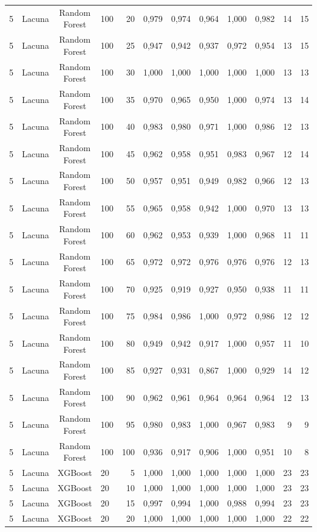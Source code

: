 \begin{longtable}{ccclrrrrrrrr}
5 & Lacuna & Random Forest & 100 & 20 & 0,979 & 0,974 & 0,964 & 1,000 & 0,982 & 14 & 15 \\
5 & Lacuna & Random Forest & 100 & 25 & 0,947 & 0,942 & 0,937 & 0,972 & 0,954 & 13 & 15 \\
5 & Lacuna & Random Forest & 100 & 30 & 1,000 & 1,000 & 1,000 & 1,000 & 1,000 & 13 & 13 \\
5 & Lacuna & Random Forest & 100 & 35 & 0,970 & 0,965 & 0,950 & 1,000 & 0,974 & 13 & 14 \\
5 & Lacuna & Random Forest & 100 & 40 & 0,983 & 0,980 & 0,971 & 1,000 & 0,986 & 12 & 13 \\
5 & Lacuna & Random Forest & 100 & 45 & 0,962 & 0,958 & 0,951 & 0,983 & 0,967 & 12 & 14 \\
5 & Lacuna & Random Forest & 100 & 50 & 0,957 & 0,951 & 0,949 & 0,982 & 0,966 & 12 & 13 \\
5 & Lacuna & Random Forest & 100 & 55 & 0,965 & 0,958 & 0,942 & 1,000 & 0,970 & 13 & 13 \\
5 & Lacuna & Random Forest & 100 & 60 & 0,962 & 0,953 & 0,939 & 1,000 & 0,968 & 11 & 11 \\
5 & Lacuna & Random Forest & 100 & 65 & 0,972 & 0,972 & 0,976 & 0,976 & 0,976 & 12 & 13 \\
5 & Lacuna & Random Forest & 100 & 70 & 0,925 & 0,919 & 0,927 & 0,950 & 0,938 & 11 & 11 \\
5 & Lacuna & Random Forest & 100 & 75 & 0,984 & 0,986 & 1,000 & 0,972 & 0,986 & 12 & 12 \\
5 & Lacuna & Random Forest & 100 & 80 & 0,949 & 0,942 & 0,917 & 1,000 & 0,957 & 11 & 10 \\
5 & Lacuna & Random Forest & 100 & 85 & 0,927 & 0,931 & 0,867 & 1,000 & 0,929 & 14 & 12 \\
5 & Lacuna & Random Forest & 100 & 90 & 0,962 & 0,961 & 0,964 & 0,964 & 0,964 & 12 & 13 \\
5 & Lacuna & Random Forest & 100 & 95 & 0,980 & 0,983 & 1,000 & 0,967 & 0,983 & 9 & 9 \\
5 & Lacuna & Random Forest & 100 & 100 & 0,936 & 0,917 & 0,906 & 1,000 & 0,951 & 10 & 8 \\
5 & Lacuna & XGBoost & 20 & 5 & 1,000 & 1,000 & 1,000 & 1,000 & 1,000 & 23 & 23 \\
5 & Lacuna & XGBoost & 20 & 10 & 1,000 & 1,000 & 1,000 & 1,000 & 1,000 & 23 & 23 \\
5 & Lacuna & XGBoost & 20 & 15 & 0,997 & 0,994 & 1,000 & 0,988 & 0,994 & 23 & 23 \\
5 & Lacuna & XGBoost & 20 & 20 & 1,000 & 1,000 & 1,000 & 1,000 & 1,000 & 22 & 22 \\

\end{longtable}
